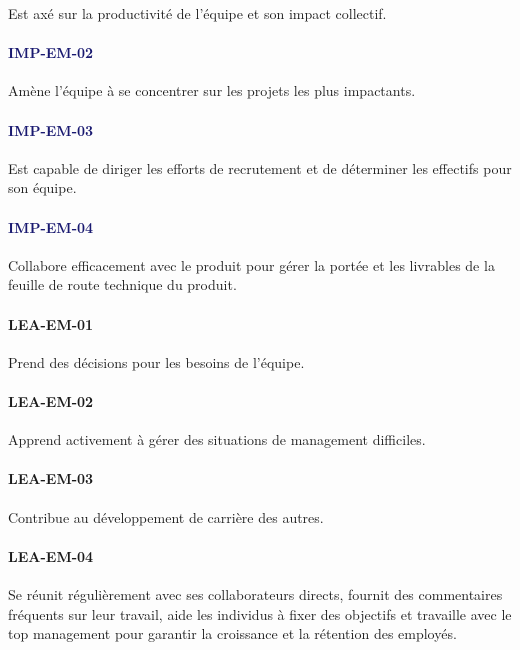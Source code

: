\documentclass[a4paper, french, openany, 12pt]{book}
\newcommand\wis[1]{\textcolor{MidnightBlue}{\textbf{\uppercase{imp-{#1}}}}}
\newcommand\cha[1]{\textcolor{OliveGreen}{\textbf{\uppercase{lea-{#1}}}}}
\begin{document}
\begin{multicols}{2}
  Est axé sur la productivité de l'équipe et son impact collectif.

  \paragraph*{\wis{em-02}}

  Amène l'équipe à se concentrer sur les projets les plus impactants.

  \paragraph*{\wis{em-03}}

  Est capable de diriger les efforts de recrutement et de déterminer les effectifs pour son équipe.

  \paragraph*{\wis{em-04}}

  Collabore efficacement avec le produit pour gérer la portée et les livrables de la feuille de route technique du
  produit.

  \paragraph*{\cha{em-01}}

  Prend des décisions pour les besoins de l'équipe.

  \paragraph*{\cha{em-02}}

  Apprend activement à gérer des situations de management difficiles.

  \paragraph*{\cha{em-03}}

  Contribue au développement de carrière des autres.

  \paragraph*{\cha{em-04}}

  Se réunit régulièrement avec ses collaborateurs directs, fournit des commentaires fréquents sur leur travail, aide les
  individus à fixer des objectifs et travaille avec le top management pour garantir la  croissance et la rétention des
  employés.


\end{multicols}
\end{document}
